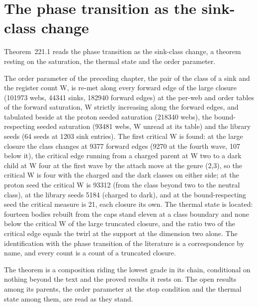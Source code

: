 \section{The phase transition as the sink-class change}\label{mod:XI-5-phase-transition-as-the-sink-class-change}
\label{narr:open:11-5}Theorem~221.1 reads the phase transition as the sink-class change, a theorem resting on the saturation, the thermal state and the order parameter.
\begin{chtheorem}\label{box:XI-5-phase-transition-as-the-sink-class-change:1}
The order parameter of the preceding chapter, the pair of the class of a sink and the register count W, is re-met along every forward edge of the large closure (101973 webs, 44341 sinks, 182940 forward edges) at the per-web and order tables of the forward saturation, W strictly increasing along the forward edges, and tabulated beside at the proton seeded saturation (218340 webs), the bound-respecting seeded saturation (93481 webs, W unread at its table) and the library seeds (64 seeds at 1203 sink entries). The first critical W is found: at the large closure the class changes at 9377 forward edges (9270 at the fourth wave, 107 below it), the critical edge running from a charged parent at W two to a dark child at W four at the first wave by the attach move at the genre (2,3), so the critical W is four with the charged and the dark classes on either side; at the proton seed the critical W is 93312 (from the class beyond two to the neutral class), at the library seeds 5184 (charged to dark), and at the bound-respecting seed the critical measure is 21, each closure its own. The thermal state is located: fourteen bodies rebuilt from the caps stand eleven at a class boundary and none below the critical W of the large truncated closure, and the ratio two of the critical edge equals the twirl at the support at the dimension two alone. The identification with the phase transition of the literature is a correspondence by name, and every count is a count of a truncated closure.
\end{chtheorem}
The theorem is a composition riding the lowest grade in its chain, conditional on nothing beyond the text and the proved results it rests on. The open results among its parents, the order parameter at the stop condition and the thermal state among them, are read as they stand.
